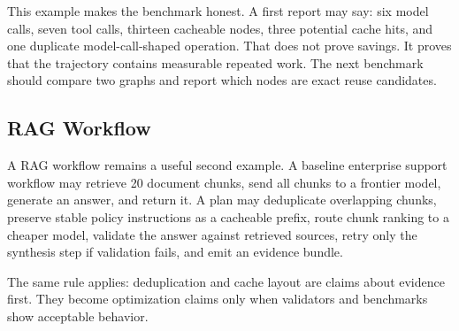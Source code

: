 This example makes the benchmark honest. A first report may say: six model calls, seven tool calls, thirteen cacheable nodes, three potential cache hits, and one duplicate model-call-shaped operation. That does not prove savings. It proves that the trajectory contains measurable repeated work. The next benchmark should compare two graphs and report which nodes are exact reuse candidates.

\subsection{RAG Workflow}

A RAG workflow remains a useful second example. A baseline enterprise support workflow may retrieve 20 document chunks, send all chunks to a frontier model, generate an answer, and return it. A \migaki{} plan may deduplicate overlapping chunks, preserve stable policy instructions as a cacheable prefix, route chunk ranking to a cheaper model, validate the answer against retrieved sources, retry only the synthesis step if validation fails, and emit an evidence bundle.

The same rule applies: deduplication and cache layout are claims about evidence first. They become optimization claims only when validators and benchmarks show acceptable behavior.

